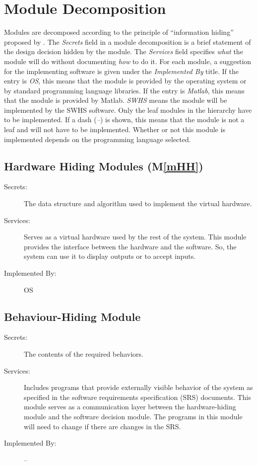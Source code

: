 \documentclass[12pt]{article}
\newcommand{\mref}[1]{M\ref{#1}}
\begin{document}
\section{Module Decomposition} \label{SecMD}

Modules are decomposed according to the principle of ``information hiding''
proposed by \citet{ParnasEtAl1984}. The \emph{Secrets} field in a module
decomposition is a brief statement of the design decision hidden by the
module. The \emph{Services} field specifies \emph{what} the module will do
without documenting \emph{how} to do it. For each module, a suggestion for the
implementing software is given under the \emph{Implemented By} title. If the
entry is \emph{OS}, this means that the module is provided by the operating
system or by standard programming language libraries. If the entry is
\emph{Matlab}, this means that the module is provided by Matlab.  \emph{SWHS} means the
module will be implemented by the SWHS software.  
Only the leaf modules in the
hierarchy have to be implemented. If a dash (\emph{--}) is shown, this means
that the module is not a leaf and will not have to be implemented. Whether or
not this module is implemented depends on the programming language
selected.

\subsection{Hardware Hiding Modules (\mref{mHH})}

\begin{description}
\item[Secrets:]The data structure and algorithm used to implement the virtual
  hardware.
\item[Services:]Serves as a virtual hardware used by the rest of the
  system. This module provides the interface between the hardware and the
  software. So, the system can use it to display outputs or to accept inputs.
\item[Implemented By:] OS
\end{description}

\subsection{Behaviour-Hiding Module}

\begin{description}
\item[Secrets:]The contents of the required behaviors.
\item[Services:]Includes programs that provide externally visible behavior of
  the system as specified in the software requirements specification (SRS)
  documents. This module serves as a communication layer between the
  hardware-hiding module and the software decision module. The programs in this
  module will need to change if there are changes in the SRS.
\item[Implemented By:] --
\end{description}
\end{document}
